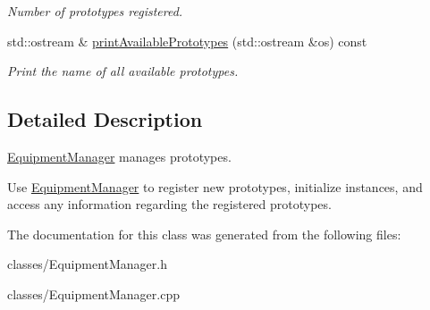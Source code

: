 \begin{DoxyCompactItemize}
\begin{DoxyCompactList}\small\item\em Number of prototypes registered. \end{DoxyCompactList}\item 
\hypertarget{class_equipment_manager_ac3a359204e3460e07f241599e888f9fa}{}std\+::ostream \& \hyperlink{class_equipment_manager_ac3a359204e3460e07f241599e888f9fa}{print\+Available\+Prototypes} (std\+::ostream \&os) const \label{class_equipment_manager_ac3a359204e3460e07f241599e888f9fa}

\begin{DoxyCompactList}\small\item\em Print the name of all available prototypes. \end{DoxyCompactList}\end{DoxyCompactItemize}


\subsection{Detailed Description}
\hyperlink{class_equipment_manager}{Equipment\+Manager} manages prototypes.

Use \hyperlink{class_equipment_manager}{Equipment\+Manager} to register new prototypes, initialize instances, and access any information regarding the registered prototypes. 

The documentation for this class was generated from the following files\+:\begin{DoxyCompactItemize}
\item 
classes/Equipment\+Manager.\+h\item 
classes/Equipment\+Manager.\+cpp\end{DoxyCompactItemize}
